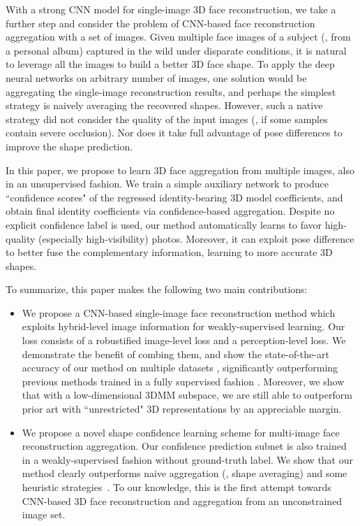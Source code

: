\documentclass[10pt,twocolumn,letterpaper]{article}
\begin{document}
With a strong CNN model for single-image 3D face reconstruction, we take a further step and consider the problem of CNN-based face reconstruction aggregation with a set of images.
Given multiple face images of a subject (\eg, from a personal album) captured in the wild under disparate conditions, it is natural to leverage all the images to build a better 3D face shape.
To apply the deep neural networks on arbitrary number of images, one solution would be aggregating the single-image reconstruction results, and perhaps the simplest strategy is naively averaging the recovered shapes. However, such a native strategy did not consider the quality of the input images (\eg, if some samples contain severe occlusion). Nor does it take full advantage of pose differences to improve the shape prediction.

In this paper, we propose to learn 3D face aggregation from multiple images, also in an unsupervised fashion. We train a simple auxiliary network to produce ``confidence scores" of the regressed identity-bearing 3D model coefficients, and obtain final identity coefficients via confidence-based aggregation. Despite no explicit confidence label is used, our method automatically learns to favor high-quality (especially high-visibility) photos. Moreover, it can exploit pose difference to better fuse the complementary information, learning to more accurate 3D shapes.

To summarize, this paper makes the following two main contributions:
\vspace{-6pt}
\begin{itemize}
	\item We propose a CNN-based single-image face reconstruction method which exploits hybrid-level image information for weakly-supervised learning. Our loss consists of a robustified image-level loss and a perception-level loss. We demonstrate the benefit of combing them, and show the state-of-the-art accuracy of our method on multiple datasets \cite{bagdanov2011florence,cao2014facewarehouse,yin20063d}, significantly outperforming previous methods trained in a fully supervised fashion 
	\cite{sela2017unrestricted,feng2018joint,tran2017regressing}. Moreover, we show that with a low-dimensional 3DMM subspace, we are still able to outperform prior art with ``unrestricted" 3D representations \cite{sela2017unrestricted,tran2018nonlinear,tewari2018self,feng2018joint} by an appreciable margin.
	
	\item We propose a novel shape confidence learning scheme for multi-image face reconstruction aggregation. Our confidence prediction subnet is also trained in a weakly-supervised fashion without ground-truth label. We show that our method clearly outperforms naive aggregation (\eg, shape averaging) and some heuristic strategies~\cite{piotraschke2016automated}. To our knowledge, this is the first attempt towards CNN-based 3D face reconstruction and aggregation from an unconstrained image set.
\end{itemize}
\end{document}
